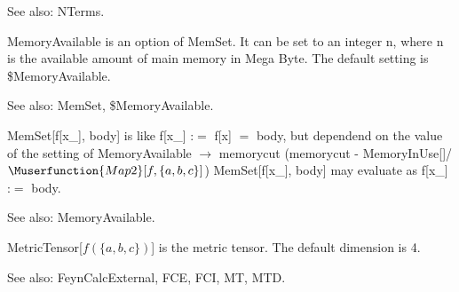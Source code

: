 See also:  NTerms.












MemoryAvailable is an option of MemSet. It can be set to an integer n, where n is the available amount of main memory in Mega Byte. The
  default setting is \${}MemoryAvailable.

See also:  MemSet, \${}MemoryAvailable.



MemSet[f[x\_{}], body] is like f[x\_{}] :\(=\) f[x] \(=\) body, but dependend on the value of the setting of MemoryAvailable
  \(\rightarrow \) memorycut (memorycut - MemoryInUse[]/\(\Muserfunction{Map2}[f,\{a,b,c\}]\)) MemSet[f[x\_{}], body] may evaluate as f[x\_{}] :\(=\)
body.

See also:  MemoryAvailable.



MetricTensor[\(f(\{a,b,c\})\)] is the metric tensor. The default dimension is 4.

See also:  FeynCalcExternal, FCE, FCI, MT, MTD.





\dispSFoutmath{
\mu ,\multsp \nu
}




